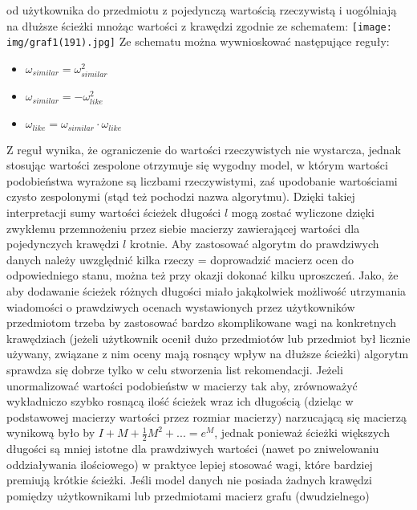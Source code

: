 \documentclass{pracamgr}
\begin{document}
    od użytkownika do przedmiotu z pojedynczą wartością rzeczywistą i uogólniają na dłuższe ścieżki mnożąc wartości z krawędzi zgodnie ze schematem:\newline
     \texttt{[image: img/graf1(191).jpg]}\newline
    Ze schematu można wywnioskować następujące reguły:
    \begin{itemize}\itemsep1pt \parskip0pt 
     \item $\omega_{similar}=\omega^2_{similar}$    
     \item $\omega_{similar}=-\omega^2_{like}$
     \item $\omega_{like}=\omega_{similar}\cdot\omega_{like}$
    \end{itemize}
    Z reguł wynika, że ograniczenie do wartości rzeczywistych nie wystarcza, jednak stosując wartości zespolone otrzymuje się wygodny model,
    w którym wartości podobieństwa wyrażone są liczbami rzeczywistymi, zaś upodobanie wartościami czysto zespolonymi (stąd też pochodzi nazwa algorytmu).
    Dzięki takiej interpretacji sumy wartości ścieżek długości $l$ mogą zostać wyliczone dzięki zwykłemu przemnożeniu przez siebie macierzy zawierającej
    wartości dla pojedynczych krawędzi $l$ krotnie.\newline
    Aby zastosować algorytm do prawdziwych danych należy uwzględnić kilka rzeczy = doprowadzić macierz ocen do odpowiedniego stanu,
    można też przy okazji dokonać kilku uproszczeń.
    Jako, że aby dodawanie ścieżek różnych długości miało jakąkolwiek możliwość utrzymania wiadomości
    o prawdziwych ocenach wystawionych przez użytkowników przedmiotom trzeba by zastosować bardzo skomplikowane wagi na konkretnych krawędziach
    (jeżeli użytkownik ocenił dużo przedmiotów lub przedmiot był licznie używany, związane z nim oceny mają rosnący wpływ na dłuższe ścieżki)
    algorytm sprawdza się dobrze tylko w celu stworzenia list rekomendacji.
    Jeżeli unormalizować wartości podobieństw w macierzy tak aby, zrównoważyć wykładniczo szybko rosnącą ilość ścieżek wraz ich długością
    (dzieląc w podstawowej macierzy wartości przez rozmiar macierzy) narzucającą się macierzą wynikową było by $I+M+\frac{1}{2}M^2+...=e^{M}$,
    jednak ponieważ ścieżki większych długości są mniej istotne dla prawdziwych wartości (nawet po zniwelowaniu oddziaływania ilościowego)
    w praktyce lepiej stosować wagi, które bardziej premiują krótkie ścieżki.
    Jeśli model danych nie posiada żadnych krawędzi pomiędzy użytkownikami lub przedmiotami macierz grafu (dwudzielnego)
\end{document}
